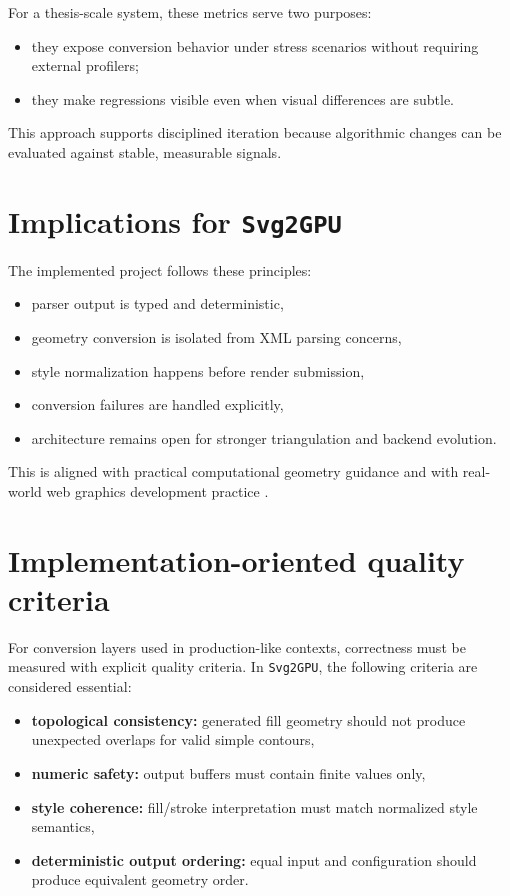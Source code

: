 For a thesis-scale system, these metrics serve two purposes:

\begin{itemize}
\item they expose conversion behavior under stress scenarios without requiring external profilers;
\item they make regressions visible even when visual differences are subtle.
\end{itemize}

This approach supports disciplined iteration because algorithmic changes can be evaluated against stable, measurable signals.

\section{Implications for \texttt{Svg2GPU}}

The implemented project follows these principles:

\begin{itemize}
\item parser output is typed and deterministic,
\item geometry conversion is isolated from XML parsing concerns,
\item style normalization happens before render submission,
\item conversion failures are handled explicitly,
\item architecture remains open for stronger triangulation and backend evolution.
\end{itemize}

This is aligned with practical computational geometry guidance \cite{deberg_computational_geometry} and with real-world web graphics development practice \cite{mapbox_earcut}.

\section{Implementation-oriented quality criteria}

For conversion layers used in production-like contexts, correctness must be measured with explicit quality criteria.
In \texttt{Svg2GPU}, the following criteria are considered essential:

\begin{itemize}
\item \textbf{topological consistency:} generated fill geometry should not produce unexpected overlaps for valid simple contours,
\item \textbf{numeric safety:} output buffers must contain finite values only,
\item \textbf{style coherence:} fill/stroke interpretation must match normalized style semantics,
\item \textbf{deterministic output ordering:} equal input and configuration should produce equivalent geometry order.
\end{itemize}

